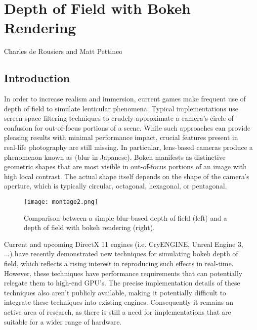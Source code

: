 \chapter{Depth of Field with Bokeh Rendering}{Charles de Rousiers and Matt Pettineo}
\label{BokehRendering}

\section{Introduction}

In order to increase realism and immersion, current games make frequent use of depth of field to simulate lenticular phenomena. Typical implementations use screen-space filtering techniques to crudely approximate a camera's circle of confusion for out-of-focus portions of a scene. While such approaches can provide pleasing results with minimal performance impact, crucial features present in real-life photography are still missing. In particular, lens-based cameras produce a phenomenon known as \bokeh (blur in Japanese). Bokeh manifests as distinctive geometric shapes that are most visible in out-of-focus portions of an image with high local contrast. The actual shape itself depends on the shape of the camera’s aperture, which is typically circular, octagonal, hexagonal, or pentagonal.

	\begin{figure}[htb]\centering
	\texttt{[image: montage2.png]}
	\caption{Comparison between a simple blur-based depth of field (left) and a depth of field with bokeh rendering (right). }
	\label{DeRousiers:blurcomparison}
	\end{figure}

Current and upcoming DirectX 11 engines (i.e. CryENGINE, Unreal Engine 3, ...) have recently demonstrated new techniques for simulating bokeh depth of field, which reflects a rising interest in reproducing such effects in real-time. However, these techniques have performance requirements that can potentially relegate them to high-end GPU's. The precise implementation details of these techniques also aren't publicly available, making it potentially difficult to integrate these techniques into existing engines. Consequently it remains an active area of research, as there is still a need for implementations that are suitable for a wider range of hardware.

